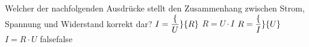     {Welcher der nachfolgenden Ausdrücke stellt den Zusammenhang zwischen Strom, Spannung und Widerstand korrekt dar?}
    {$I = \dfrac\{U\}\{R\}$}
    {$R = U \cdot I$}
    {$R = \dfrac\{I\}\{U\}$}
    {$I =R \cdot U$}
    {false}{false}